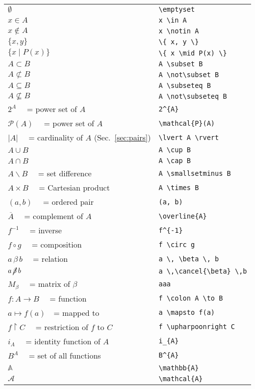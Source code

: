 \documentclass[a4paper,10pt,landscape]{article}
\theoremstyle{definition}
\theoremstyle{remark}
\newcommand{\refsec}[1]{Sec.~\ref{#1}}
\begin{document}
\begin{multicols}{3}
\begin{tabular}{@{}ll@{}}
	$\emptyset$	&\verb!\emptyset!\\
	$x \in A$	&\verb!x \in A!\\
	$x \notin A$	&\verb!x \notin A!\\
	$\{ x, y \}$	& \verb!\{ x, y \}!\\
	$\{ x \mid P(x) \}$	&\verb!\{ x \mid P(x) \}!\\
	$A \subset B$	&\verb!A \subset B!\\
	$A \not\subset B$	&\verb!A \not\subset B!\\
	$A \subseteq B$	&\verb!A \subseteq B!\\
	$A \not\subseteq B$	&\verb!A \not\subseteq B!\\
	$2^{A}$ 	~~= power set of $A$	&\verb!2^{A}!\\
	$\mathcal{P}(A)$ 	~~= power set of $A$	&\verb!\mathcal{P}(A)!\\
	$\lvert A \rvert$  	~~= cardinality of $A$ (\refsec{sec:pairs})	&\verb!\lvert A \rvert!\\
	$A \cup B$	&\verb!A \cup B!\\
	$A \cap B$	&\verb!A \cap B!\\
	$A \smallsetminus B$	~~= set difference	&\verb!A \smallsetminus B!\\
	$A \times B$  	~~= Cartesian product	&\verb!A \times B!\\
	$(a, b)$ 	~~= ordered pair	&\verb!(a, b)!\\
%	
	$\overline{A}$	~~= complement of $A$	&\verb!\overline{A}!\\
	$f^{-1}$	~~= inverse	&\verb!f^{-1}!\\
	$f \circ g$	~~= composition	&\verb!f \circ g!\\
	$a \, \beta \, b$ 	~~= relation	&\verb!a \, \beta \, b!\\
	$a \, \cancel{\beta} \, b$	&\verb!a \,\cancel{\beta} \,b!\\
	$M_{\beta}$ 	~~= matrix of $\beta$	&\verb!aaa!\\
	$f \colon A \to B$	~~= function	&\verb!f \colon A \to B!\\
	$a \mapsto f(a)$~~= mapped to	&\verb!a \mapsto f(a)!\\
	$f \upharpoonright C$	~~= restriction of $f$ to $C$	&\verb!f \upharpoonright C!\\
	$i_{A}$	~~= identity function of $A$	&\verb!i_{A}!\\
	$B^{A}$	~~= set of all functions	&\verb!B^{A}!\\
	$\mathbb{A}$	&\verb!\mathbb{A}!\\
	$\mathcal{A}$	&\verb!\mathcal{A}!\\
\end{tabular}





\end{multicols}
\end{document}

